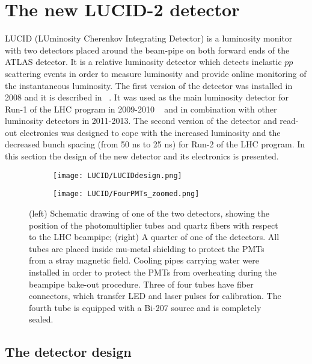 \section{The new LUCID-2 detector}
\label{sec:LUCID}

LUCID (LUminosity Cherenkov Integrating Detector) is a luminosity monitor with two detectors placed around the beam-pipe on both forward ends of the ATLAS detector.
It is a relative luminosity detector which detects inelastic $pp$ scattering events in order to measure luminosity and provide online monitoring of the instantaneous luminosity.
The first version of the detector was installed in 2008 and it is described in ~\cite{Aad:2008zzm}.
It was used as the main luminosity detector for Run-1 of the LHC program in 2009-2010 ~\cite{Aad:2013ucp} and in combination with other luminosity detectors in 2011-2013.
The second version of the detector and read-out electronics was designed to cope with 
the increased luminosity and the decreased bunch spacing (from 50 ns to 25 ns) for Run-2 of the LHC program.
In this section the design of the new detector and its electronics is presented. 

\begin{figure}
\centering
\begin{subfigure}{.5\textwidth}
  \centering
  \texttt{[image: LUCID/LUCIDdesign.png]}
\end{subfigure}%
\begin{subfigure}{.5\textwidth}
  \centering
  \texttt{[image: LUCID/FourPMTs\_zoomed.png]}
\end{subfigure}
\caption{(left) Schematic drawing of one of the two detectors, showing the position of the photomultiplier tubes 
and quartz fibers with respect to the LHC beampipe; (right) A quarter of one of the detectors. All tubes are 
placed inside mu-metal shielding to protect the PMTs from a stray magnetic field. Cooling pipes carrying water were installed in order 
to protect the PMTs from overheating during the beampipe bake-out procedure. Three of four tubes have fiber connectors, which
transfer LED and laser pulses for calibration. The fourth tube is equipped with a Bi-207 source and is completely 
sealed.}
\label{fig:LucidDrawing}
\end{figure}

\subsection{The detector design}
\label{subsec:newLucidDesign}

